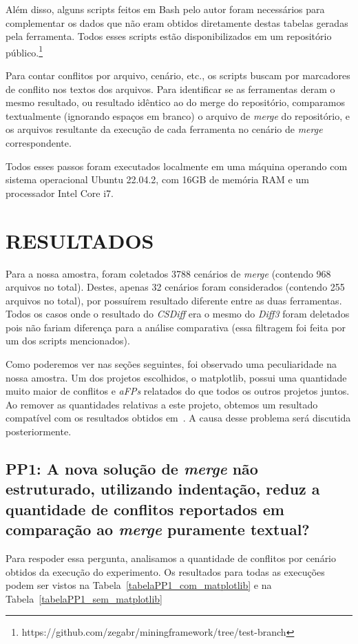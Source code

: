 Além disso, alguns scripts feitos em Bash pelo autor foram necessários para
complementar os dados que não eram obtidos diretamente destas tabelas geradas
pela ferramenta. Todos esses scripts estão disponibilizados em um repositório
público.\footnote{https://github.com/zegabr/miningframework/tree/test-branch} %

Para contar conflitos por arquivo, cenário, etc., os scripts buscam por
marcadores de conflito nos textos dos arquivos. Para identificar se as
ferramentas deram o mesmo resultado, ou resultado idêntico ao do merge do
repositório, comparamos textualmente (ignorando espaços em branco) o arquivo de
\emph{merge} do repositório, e os arquivos resultante da execução de cada
ferramenta no cenário de \emph{merge} correspondente.

Todos esses passos foram executados localmente em uma máquina operando com
sistema operacional Ubuntu 22.04.2, com 16GB de memória RAM e um processador
Intel Core i7.

\section{RESULTADOS}

Para a nossa amostra, foram coletados 3788 cenários de \emph{merge} (contendo
968 arquivos no total). Destes, apenas 32 cenários foram considerados (contendo
255 arquivos no total), por possuírem resultado diferente entre as duas
ferramentas. Todos os casos onde o resultado do \emph{CSDiff} era o mesmo do
\emph{Diff3} foram deletados pois não fariam diferença para a análise
comparativa (essa filtragem foi feita por um dos scripts mencionados).

Como poderemos ver nas seções seguintes, foi observado uma peculiaridade na
nossa amostra. Um dos projetos escolhidos, o matplotlib, possui uma quantidade
muito maior de conflitos e \emph{aFPs} relatados do que todos os outros
projetos juntos. Ao remover as quantidades relativas a este projeto, obtemos um
resultado compatível com os resultados obtidos
em~\cite{clem21,heitor21}. A causa desse problema será discutida
posteriormente.

\subsection{PP1: A nova solução de \emph{merge} não estruturado, utilizando
	indentação, reduz a quantidade de conflitos reportados em comparação ao
	\emph{merge} puramente textual?}

Para respoder essa pergunta, analisamos a quantidade de conflitos por cenário
obtidos da execução do experimento. Os resultados para todas as execuções podem
ser vistos na Tabela~\ref{tabelaPP1_com_matplotlib} e na
Tabela~\ref{tabelaPP1_sem_matplotlib}

